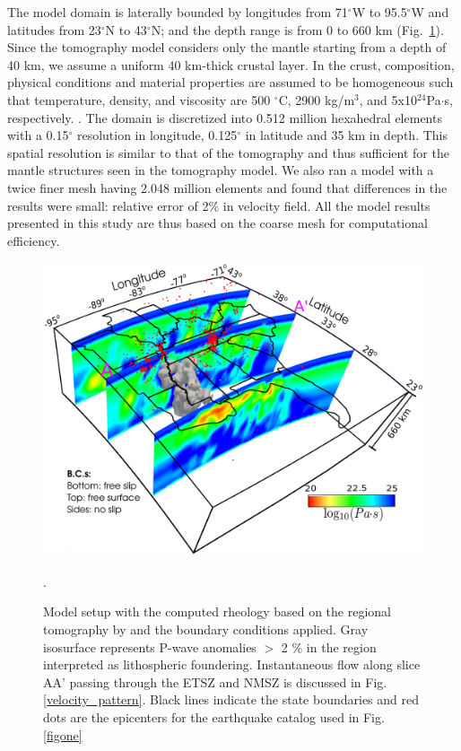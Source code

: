 \documentclass[draft,linenumbers]{agujournal2018}
\begin{document}
     The model domain is laterally bounded by longitudes from 71$^{\circ}$W to 95.5$^{\circ}$W and latitudes from 23$^{\circ}$N to 43$^{\circ}$N; and the depth range is from 0 to 660 km (Fig.~\ref{fig_model}). Since the tomography model considers only the mantle starting from a depth of 40 km, we assume a uniform 40 km-thick crustal layer. In the crust, composition, physical conditions and material properties are assumed to be homogeneous such that temperature, density, and viscosity are 500 $^{\circ}$C, 2900 kg/m$^{3}$, and 5x10$^{24}$Pa$\cdot$s, respectively. . The domain is discretized into 0.512 million hexahedral elements with a 0.15$^{\circ}$ resolution in longitude, 0.125$^{\circ}$ in latitude and 35 km in depth. This spatial resolution is similar to that of the tomography and thus sufficient for the mantle structures seen in the tomography model. We also ran a  model with a twice finer mesh having 2.048 million elements and found that differences in the results were small: relative error of 2\% in velocity field. All the model results presented in this study are thus based on the coarse mesh for computational efficiency.
%
\begin{figure}[ht]
    \centering
    \includegraphics[width=0.75\linewidth]{figures/model_figure.png}
    \caption{Model setup with the computed rheology based on the regional tomography by \citet{Biryol_2016} and the boundary conditions applied. Gray isosurface represents P-wave anomalies $>$ 2 \% in the region interpreted as lithospheric foundering. Instantaneous flow along slice AA' passing through the ETSZ and NMSZ is discussed in Fig. \ref{velocity_pattern}. Black lines indicate the state boundaries and red dots are the epicenters for the earthquake catalog used in Fig. \ref{figone}}.
    \label{fig_model}
\end{figure}
\end{document}
